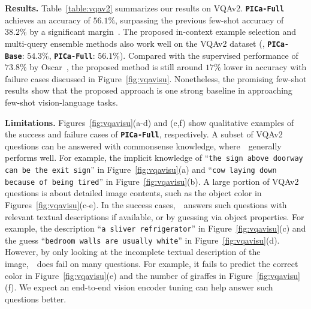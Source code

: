 \vspace{2mm}
\noindent\textbf{Results.}
Table~\ref{table:vqav2} summarizes our results on VQAv2. \textbf{\texttt{PICa-Full}} achieves an accuracy of $56.1\%$, surpassing the previous few-shot accuracy of $38.2\%$ by a significant margin~\cite{tsimpoukelli2021multimodal}. The proposed in-context example selection and multi-query ensemble methods also work well on the VQAv2 dataset (\cf, \textbf{\texttt{PICa-Base}}: $54.3\%$, \textbf{\texttt{PICa-Full}}: $56.1\%$). Compared with the supervised performance of $73.8\%$ by Oscar~\cite{li2020oscar}, the proposed method is still around $17\%$ lower in accuracy with failure cases discussed in Figure~\ref{fig:vqavisu}. Nonetheless, the promising few-shot results show that the proposed approach is one strong baseline in approaching few-shot vision-language tasks.


\vspace{2mm}
\noindent\textbf{Limitations.}
Figures~\ref{fig:vqavisu}(a-d) and (e,f) show qualitative examples of the success and failure cases of \textbf{\texttt{PICa-Full}}, respectively. 
A subset of VQAv2 questions can be answered with commonsense knowledge, where~\oursmodel~generally performs well. For example, the implicit knowledge of ``\texttt{the sign above doorway can be the exit sign}'' in Figure~\ref{fig:vqavisu}(a) and ``\texttt{cow laying down because of being tired}'' in Figure~\ref{fig:vqavisu}(b). A large portion of VQAv2 questions is about detailed image contents, such as the object color in Figures~\ref{fig:vqavisu}(c-e). In the success cases,~\oursmodel~answers such questions with relevant textual descriptions if available, or by guessing via object properties. For example,  the description ``\texttt{a sliver refrigerator}'' in Figure~\ref{fig:vqavisu}(c) and the guess ``\texttt{bedroom walls are usually white}'' in Figure~\ref{fig:vqavisu}(d). However, by only looking at the incomplete textual description of the image,~\oursmodel~does fail on many questions. For example, it fails to predict the correct color in Figure~\ref{fig:vqavisu}(e) and the number of giraffes in Figure~\ref{fig:vqavisu}(f). We expect an end-to-end vision encoder tuning can help answer such questions better.